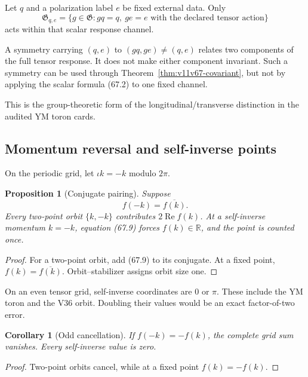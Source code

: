 \documentclass[11pt]{article}
\newtheorem{proposition}[theorem]{Proposition}
\newtheorem{corollary}[theorem]{Corollary}
\begin{document}
Let \(q\) and a polarization label \(e\) be fixed external data.
Only
\[
 {\mathfrak G}_{q,e}
 =\{g\in{\mathfrak G}:gq=q,\ ge=e
       \text{ with the declared tensor action}\}             \tag{67.8}
\]
acts within that scalar response channel.

\begin{warning}
\label{warn:v11v67-external}
A symmetry carrying \((q,e)\) to \((gq,ge)\ne(q,e)\) relates two
components of the full tensor response.  It does not make either
component invariant.  Such a symmetry can be used through
Theorem~\ref{thm:v11v67-covariant}, but not by applying the scalar
formula (67.2) to one fixed channel.
\end{warning}

This is the group-theoretic form of the longitudinal/transverse
distinction in the audited YM toron cards.

\subsection{Momentum reversal and self-inverse points}

On the periodic grid, let \(\iota k=-k\) modulo \(2\pi\).

\begin{proposition}[Conjugate pairing]
\label{prop:v11v67-conjugate}
Suppose
\[
                              f(-k)=\overline{f(k)}.           \tag{67.9}
\]
Every two-point orbit \(\{k,-k\}\) contributes
\(2\operatorname{Re}f(k)\).  At a self-inverse momentum
\(k=-k\), equation (67.9) forces \(f(k)\in\mathbb R\), and the point is
counted once.
\end{proposition}

\begin{proof}
For a two-point orbit, add (67.9) to its conjugate.  At a fixed point,
\(f(k)=\overline{f(k)}\).  Orbit--stabilizer assigns orbit size one.
\end{proof}

On an even tensor grid, self-inverse coordinates are \(0\) or \(\pi\).
These include the YM toron and the V36 orbit.  Doubling their values
would be an exact factor-of-two error.

\begin{corollary}[Odd cancellation]
\label{cor:v11v67-odd}
If \(f(-k)=-f(k)\), the complete grid sum vanishes.  Every
self-inverse value is zero.
\end{corollary}

\begin{proof}
Two-point orbits cancel, while at a fixed point
\(f(k)=-f(k)\).
\end{proof}
\end{document}
